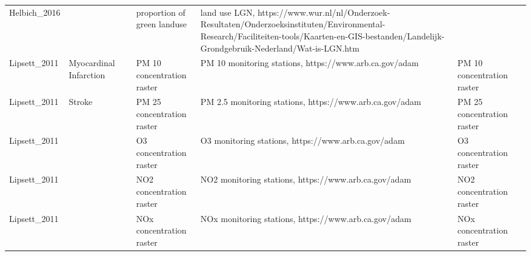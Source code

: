 \documentclass{article}
\begin{document}
\begin{table}
\begin{tabular}{lllllll}
Helbich\_2016    &                                                                                                     &         & proportion of green landuse                                                                   & land use LGN, https://www.wur.nl/nl/Onderzoek-Resultaten/Onderzoeksinstituten/Environmental-Research/Faciliteiten-tools/Kaarten-en-GIS-bestanden/Landelijk-Grondgebruik-Nederland/Wat-is-LGN.htm &                                       &          \\
Lipsett\_2011    & Myocardinal Infarction                                                                              &         & PM 10 concentration raster                                                                    & PM 10 monitoring stations, https://www.arb.ca.gov/adam                                                                                                                                           & PM 10 concentration raster            &          \\
Lipsett\_2011    & Stroke                                                                                              &         & PM 25 concentration raster                                                                    & PM 2.5 monitoring stations, https://www.arb.ca.gov/adam                                                                                                                                          & PM 25 concentration raster            &          \\
Lipsett\_2011    &                                                                                                     &         & O3 concentration raster                                                                       & O3 monitoring stations, https://www.arb.ca.gov/adam                                                                                                                                              & O3 concentration raster               &          \\
Lipsett\_2011    &                                                                                                     &         & NO2 concentration raster                                                                      & NO2 monitoring stations, https://www.arb.ca.gov/adam                                                                                                                                             & NO2 concentration raster              &          \\
Lipsett\_2011    &                                                                                                     &         & NOx concentration raster                                                                      & NOx monitoring stations, https://www.arb.ca.gov/adam                                                                                                                                             & NOx concentration raster              &          \\

\end{tabular}
\end{table}
\end{document}
